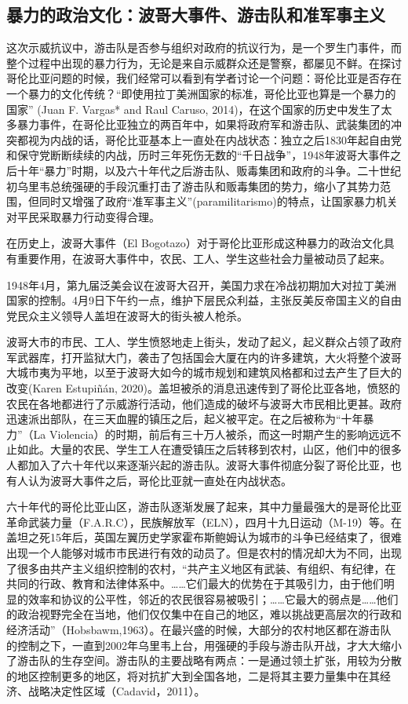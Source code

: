 \documentclass{phyasgn}\usepackage{nag}
\begin{document}
\subsection{暴力的政治文化：波哥大事件、游击队和准军事主义}
这次示威抗议中，游击队是否参与组织对政府的抗议行为，是一个罗生门事件，而整个过程中出现的暴力行为，无论是来自示威群众还是警察，都屡见不鲜。在探讨哥伦比亚问题的时候，我们经常可以看到有学者讨论一个问题：哥伦比亚是否存在一个暴力的文化传统？“即使用拉丁美洲国家的标准，哥伦比亚也算是一个暴力的国家” (Juan F. Vargas* and Raul Caruso, 2014)，在这个国家的历史中发生了太多暴力事件，在哥伦比亚独立的两百年中，如果将政府军和游击队、武装集团的冲突都视为内战的话，哥伦比亚基本上一直处在内战状态：独立之后1830年起自由党和保守党断断续续的内战，历时三年死伤无数的“千日战争”，1948年波哥大事件之后十年“暴力”时期，以及六十年代之后游击队、贩毒集团和政府的斗争。二十世纪初乌里韦总统强硬的手段沉重打击了游击队和贩毒集团的势力，缩小了其势力范围，但同时又增强了政府“准军事主义”(paramilitarismo)的特点，让国家暴力机关对平民采取暴力行动变得合理。
\par 在历史上，波哥大事件（El Bogotazo）对于哥伦比亚形成这种暴力的政治文化具有重要作用，在波哥大事件中，农民、工人、学生这些社会力量被动员了起来。
\par 1948年4月，第九届泛美会议在波哥大召开，美国力求在冷战初期加大对拉丁美洲国家的控制。4月9日下午约一点，维护下层民众利益，主张反美反帝国主义的自由党民众主义领导人盖坦在波哥大的街头被人枪杀。
\par 波哥大市的市民、工人、学生愤怒地走上街头，发动了起义，起义群众占领了政府军武器库，打开监狱大门，袭击了包括国会大厦在内的许多建筑，大火将整个波哥大城市夷为平地，以至于波哥大如今的城市规划和建筑风格都和过去产生了巨大的改变(Karen Estupiñán, 2020)。盖坦被杀的消息迅速传到了哥伦比亚各地，愤怒的农民在各地都进行了示威游行活动，他们造成的破坏与波哥大市民相比更甚。政府迅速派出部队，在三天血腥的镇压之后，起义被平定。在之后被称为“十年暴力”（La Violencia）的时期，前后有三十万人被杀，而这一时期产生的影响远远不止如此。大量的农民、学生工人在遭受镇压之后转移到农村，山区，他们中的很多人都加入了六十年代以来逐渐兴起的游击队。波哥大事件彻底分裂了哥伦比亚，也有人认为波哥大事件之后，哥伦比亚就一直处在内战状态。
\par 六十年代的哥伦比亚山区，游击队逐渐发展了起来，其中力量最强大的是哥伦比亚革命武装力量（F.A.R.C），民族解放军（ELN），四月十九日运动（M-19）等。在盖坦之死15年后，英国左翼历史学家霍布斯鲍姆认为城市的斗争已经结束了，很难出现一个人能够对城市市民进行有效的动员了。但是农村的情况却大为不同，出现了很多由共产主义组织控制的农村，“共产主义地区有武装、有组织、有纪律，在共同的行政、教育和法律体系中。……它们最大的优势在于其吸引力，由于他们明显的效率和协议的公平性，邻近的农民很容易被吸引；……它最大的弱点是……他们的政治视野完全在当地，他们仅仅集中在自己的地区，难以挑战更高层次的行政和经济活动”（Hobsbawm,1963）。在最兴盛的时候，大部分的农村地区都在游击队的控制之下，一直到2002年乌里韦上台，用强硬的手段与游击队开战，才大大缩小了游击队的生存空间。游击队的主要战略有两点：一是通过领土扩张，用较为分散的地区控制更多的地区，将对抗扩大到全国各地，二是将其主要力量集中在其经济、战略决定性区域（Cadavid，2011）。
\end{document}
